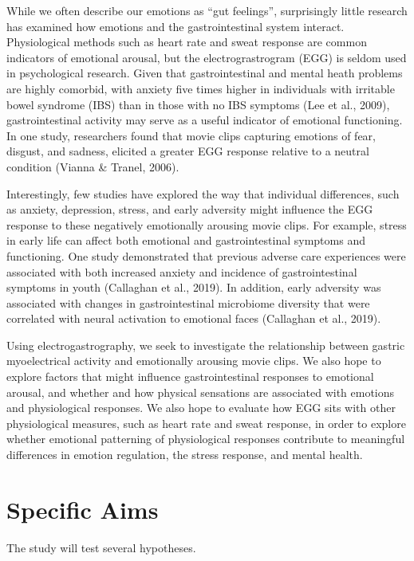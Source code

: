 \documentclass[]{book}
\begin{document}
While we often describe our emotions as ``gut feelings'', surprisingly little research has examined how emotions and the gastrointestinal system interact. Physiological methods such as heart rate and sweat response are common indicators of emotional arousal, but the electrograstrogram (EGG) is seldom used in psychological research. Given that gastrointestinal and mental heath problems are highly comorbid, with anxiety five times higher in individuals with irritable bowel syndrome (IBS) than in those with no IBS symptoms (Lee et al., 2009), gastrointestinal activity may serve as a useful indicator of emotional functioning. In one study, researchers found that movie clips capturing emotions of fear, disgust, and sadness, elicited a greater EGG response relative to a neutral condition (Vianna \& Tranel, 2006).

Interestingly, few studies have explored the way that individual differences, such as anxiety, depression, stress, and early adversity might influence the EGG response to these negatively emotionally arousing movie clips. For example, stress in early life can affect both emotional and gastrointestinal symptoms and functioning. One study demonstrated that previous adverse care experiences were associated with both increased anxiety and incidence of gastrointestinal symptoms in youth (Callaghan et al., 2019). In addition, early adversity was associated with changes in gastrointestinal microbiome diversity that were correlated with neural activation to emotional faces (Callaghan et al., 2019).

Using electrogastrography, we seek to investigate the relationship between gastric myoelectrical activity and emotionally arousing movie clips. We also hope to explore factors that might influence gastrointestinal responses to emotional arousal, and whether and how physical sensations are associated with emotions and physiological responses. We also hope to evaluate how EGG sits with other physiological measures, such as heart rate and sweat response, in order to explore whether emotional patterning of physiological responses contribute to meaningful differences in emotion regulation, the stress response, and mental health.

\hypertarget{specific-aims-1}{%
\section{Specific Aims}\label{specific-aims-1}}

The study will test several hypotheses.
\end{document}

